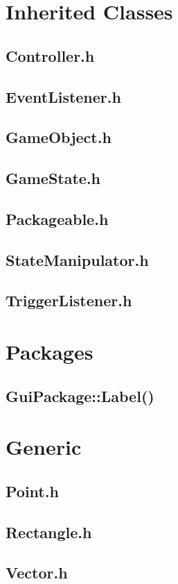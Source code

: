 \documentclass[12pt]{article}
\begin{document}
\section{Inherited Classes}
\subsection{Controller.h}
\subsection{EventListener.h}
\subsection{GameObject.h}
\subsection{GameState.h}
\subsection{Packageable.h}
\subsection{StateManipulator.h}
\subsection{TriggerListener.h}
\section{Packages}
\subsection{GuiPackage::Label()}
\section{Generic}
\subsection{Point.h}
\subsection{Rectangle.h}
\subsection{Vector.h}
\end{document}
